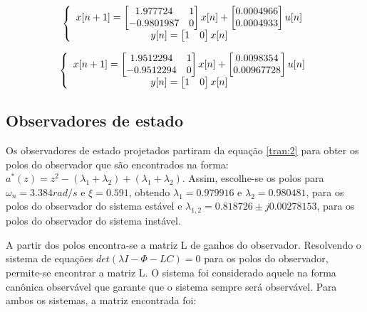 \begin{equation} \label{obsv:canon:est}
\centering
\left \{
\begin{array}{cc}
x[n+1] = \begin{bmatrix} 1.977724 & 1 \\ -0.9801987 & 0 \end{bmatrix} x[n] + \begin{bmatrix} 0.0004966 \\ 0.0004933 \end{bmatrix} u[n] \\
y[n] = \begin{bmatrix} 1 & 0  \end{bmatrix} x[n] \\
\end{array}
\right.
\end{equation}

\begin{equation} \label{obsv:canon:ins}
\centering
\left \{
\begin{array}{cc}
x[n+1] = \begin{bmatrix} 1.9512294 & 1 \\ -0.9512294 & 0 \end{bmatrix} x[n] + \begin{bmatrix} 0.0098354 \\ 0.00967728 \end{bmatrix} u[n] \\
y[n] = \begin{bmatrix} 1 & 0  \end{bmatrix} x[n] \\
\end{array}
\right.
\end{equation}


\subsection{Observadores de estado}

Os observadores de estado projetados partiram da equação \ref{tran:2} para obter os polos do observador que são encontrados na forma: $a^*(z) = z^2 - (\lambda_1+\lambda_2) + (\lambda_1+\lambda_2)$. Assim, escolhe-se os polos para $\omega_n = 3.384 rad/s$ e $\xi = 0.591$, obtendo $\lambda_1=0.979916$ e $\lambda_2=0.980481$, para os polos do observador do sistema estável e $\lambda_{1,2}=0.818726\pm j0.00278153$, para os polos do observador do sistema instável.

A partir dos polos encontra-se a matriz L de ganhos do observador. Resolvendo o sistema de equações $det(\lambda I - \Phi - LC) = 0$ para os polos do observador, permite-se encontrar a matriz L. O sistema foi considerado aquele na forma canônica observável que garante que o sistema sempre será observável. Para ambos os sistemas, a matriz encontrada foi:


